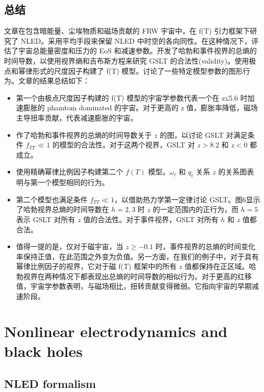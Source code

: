 \documentclass[9pt, dvipsnames]{beamer} %
\begin{document}
\subsection{总结}

\begin{frame}
    文章在包含暗能量、尘埃物质和磁场贡献的 FRW 宇宙中，在 f(T) 引力框架下研究了 NLED。采用平均手段来保留 NLED 中时空的各向同性。在这种情况下，评估了宇宙总能量密度和压力的 EoS 和减速参数。开发了哈勃和事件视界的总熵的时间导数，以使用视界熵和吉布斯方程来研究 GSLT 的合法性(validity)。使用极点和幂律形式的尺度因子构建了 f(T) 模型。讨论了一些特定模型参数的图形行为。文章的结果总结如下：


    \begin{itemize}
        \item 第一个由极点尺度因子构建的 f(T) 模型的宇宙学参数代表一个在 z≤5.6 时加速膨胀的 phamtom dominated 的宇宙。对于更高的 z 值，膨胀率降低，磁场主导扭率贡献，代表减速膨胀的宇宙。
        \item 作了哈勃和事件视界的总熵的时间导数关于 $z$ 的图，以讨论 GSLT 对满足条件 $f_{TT} \ll 1 $  的模型的合法性。对于这两个视界，GSLT 对 $z >8.2$ 和 $z <0$ 都成立。
        \item 使用精确幂律比例因子构建第二个 $f(T)$ 模型。$\omega_t$ 和 $q_t$ 关系 $z$ 的关系图表明与第一个模型相同的行为。
        \item 第二个模型也满足条件 $f_{TT}\ll 1$，以借助热力学第一定律讨论 GSLT。图6显示了哈勃视界总熵的时间导数在 $h = 2,3$ 时 $z$ 的一定范围内的正行为，而 $h = 5$ 表示 GSLT 对所有 $z$ 值的合法性。对于事件视界，GSLT 对所有 $h$ 和 $z$ 值都合法。
        \item 值得一提的是，仅对于磁宇宙，当 $z \geqslant -0.1$ 时，事件视界的总熵的时间变化率保持正值，在此范围之外变为负值。另一方面，在我们的例子中，对于具有幂律比例因子的视界，它对于磁 f(T) 框架中的所有 $z$ 值都保持在正区域。哈勃视界在两种情况下都表现出总熵的时间导数的相似行为。对于更高的红移值，宇宙学参数表明，与磁场相比，扭转贡献变得微弱。它指向宇宙的早期减速阶段。
    \end{itemize}
\end{frame}

\section{Nonlinear electrodynamics and black holes}



\subsection{NLED formalism}
\end{document}
